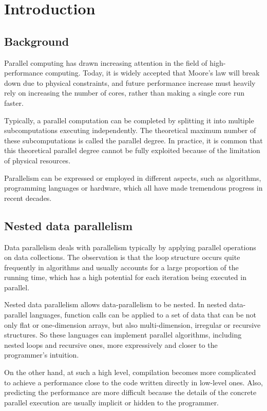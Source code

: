 
\chapter{Introduction}

\section{Background}

Parallel computing has drawn increasing attention in the field of high-performance computing.
Today, it is widely accepted that Moore's law will  break down due to physical constraints, and future performance increase must heavily rely on increasing the number of cores, rather than making a single core run faster. 

Typically, a parallel computation can be completed by splitting it into multiple subcomputations executing independently.
The theoretical maximum number of these subcomputations is called the parallel degree. 
In practice, it is common that this theoretical parallel degree cannot be fully exploited because of the limitation of physical resources.

Parallelism can be expressed or employed in different aspects, such as algorithms, programming languages or hardware, which all have made tremendous progress in recent decades.


\section{Nested data parallelism}

Data parallelism deals with parallelism typically by applying parallel operations on data collections.
The observation is that the loop structure occurs quite frequently in algorithms and usually accounts for a large proportion of the running time, which has a high potential for each iteration being executed in parallel.

Nested data parallelism allows data-parallelism to be nested.
In nested data-parallel languages, function calls can be applied to a set of data that can be not only flat or one-dimension arrays, but also multi-dimension, irregular or recursive structures. 
So these languages can implement parallel algorithms, including nested loops and recursive ones, more expressively and closer to the programmer's intuition.

On the other hand, at such a high level, compilation becomes more complicated to achieve a performance close to the code written directly in low-level ones. 
Also, predicting the performance are more difficult because the details of the concrete parallel execution are usually implicit or hidden to the programmer.

